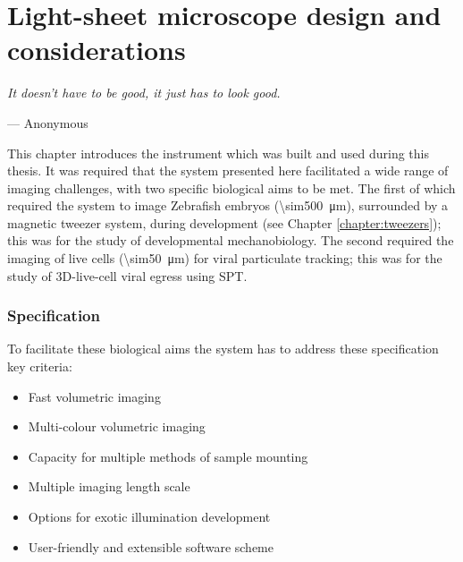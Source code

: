 

\ifpdf
    \graphicspath{{Chapters/design/Figs/Raster/}{Chapters/design/Figs/PDF/}{Chapters/design/Figs/}}
\else
    \graphicspath{{Chapters/design/Figs/Vector/}{Chapters/design/Figs/}}
\fi



\chapter{Light-sheet microscope design and considerations }\label{chapter:design}

\epigraph{\emph{It doesn't have to be good, it just has to look good.}}{--- Anonymous}

This chapter introduces the instrument which was built and used during this thesis.
It was required that the system presented here facilitated a wide range of imaging challenges, with two specific biological aims to be met.
The first of which required the system to image Zebrafish embryos (\SI{\sim500}{\micro\meter}), surrounded by a magnetic tweezer system, during development (see Chapter \ref{chapter:tweezers}); this was for the study of developmental mechanobiology.
The second required the imaging of live cells (\SI{\sim50}{\micro\meter}) for viral particulate tracking; this was for the study of 3D-live-cell viral egress using SPT.

\subsection*{Specification}

To facilitate these biological aims the system has to address these specification key criteria:

\begin{itemize}
    \item Fast volumetric imaging
    \item Multi-colour volumetric imaging
    \item Capacity for multiple methods of sample mounting
    \item Multiple imaging length scale%
    \item Options for exotic illumination development
    \item User-friendly and extensible software scheme
\end{itemize}

